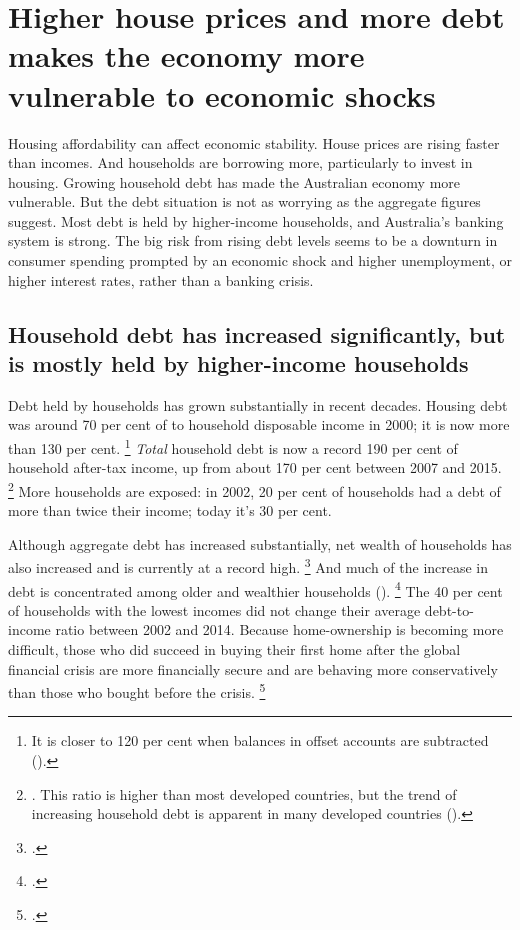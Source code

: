\section{Higher house prices and more debt makes the economy more vulnerable to economic shocks}\label{sec:higher-house-prices-and-more-debt-makes-the-economy-more-vulnerable-to-economic-shocks}

Housing affordability can affect economic stability.
House prices are rising faster than incomes.
And households are borrowing more, particularly to invest in housing.
Growing household debt has made the Australian economy more vulnerable.
But the debt situation is not as worrying as the aggregate figures suggest.
Most debt is held by higher-income households, and Australia's banking system is strong.
The big risk from rising debt levels seems to be a downturn in consumer spending prompted by an economic shock and higher unemployment, or higher interest rates, rather than a banking crisis.

\subsection{Household debt has increased significantly, but is mostly held by higher-income households}\label{subsec:household-debt-has-increased-significantly-but-is-mostly-held-by-higher-income-households}

Debt held by households has grown substantially in recent decades.
Housing debt was around 70 per cent of to household disposable income in 2000; it is now more than 130 per cent.%
	\footnote{It is closer to 120 per cent when balances in offset accounts are subtracted (\textcite[][Graph~2.5]{RBAFinancialStabilityOct2017}).}
\emph{Total} household debt is now a record 190 per cent of household after-tax income, up from about 170 per cent between 2007 and 2015.%
	\footnote{\textcite{RBA2017selectedratios-e2}.
	This ratio is higher than most developed countries, but the trend of increasing household debt is apparent in many developed countries (\textcite[][Figure~1]{Simon-Stone-2017-Property-Ladder}).}
More households are exposed: in 2002, 20 per cent of households had a debt of more than twice their income; today it's 30 per cent.

Although aggregate debt has increased substantially, net wealth of households has also increased and is currently at a record high.%
	\footcites{Lowe2017Householddebt}{ABS-2017-HouseholdIncomeAndWealth-201516}
And much of the increase in debt is concentrated among older and wealthier households ().%
	\footcite{Lowe2017Householddebt}
The 40 per cent of households with the lowest incomes did not change their average debt-to-income ratio between 2002 and 2014.
Because home-ownership is becoming more difficult, those who did succeed in buying their first home after the global financial crisis are more financially secure and are behaving more conservatively than those who bought before the crisis.%
	\footcite{Simon-Stone-2017-Property-Ladder}

